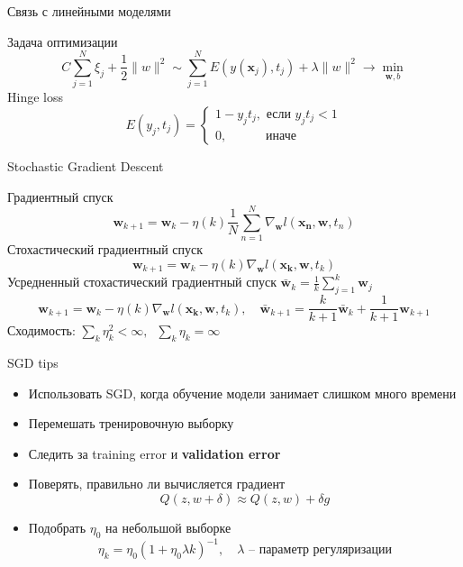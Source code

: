 \documentclass[aspectratio=169]{beamer}
\begin{document}
\begin{frame}{Связь с линейными моделями}

Задача оптимизации 
\[
C \sum_{j=1}^N \xi_j + \frac{1}{2} \|w\|^2 \sim \sum_{j=1}^N E(y(\mathbf{x}_j), t_j) + \lambda \|w\|^2 \rightarrow \min_{\mathbf{w}, b}
\]
Hinge loss
\[
E(y_j, t_j) = \begin{cases}
1 - y_j t_j, \text{ если } y_j t_j < 1 \\
0, \quad\quad\;\;\,\text{ иначе }
\end{cases}
\]

\end{frame}

\begin{frame}{Stochastic Gradient Descent}

Градиентный спуск
\[
\mathbf{w}_{k+1} = \mathbf{w}_k - \eta(k) \frac 1 N \sum_{n=1}^N \nabla_\mathbf{w} l(\mathbf{x_n, \mathbf{w}}, t_n)
\]
Стохастический градиентный спуск
\[
\mathbf{w}_{k+1} = \mathbf{w}_k - \eta(k) \nabla_\mathbf{w} l(\mathbf{x_k, \mathbf{w}}, t_k)
\]
Усредненный стохастический градиентный спуск $\bar{\mathbf{w}}_k = \frac 1 k \sum_{j=1}^k \mathbf{w}_j$
\[
\mathbf{w}_{k+1} = \mathbf{w}_k - \eta(k) \nabla_\mathbf{w} l(\mathbf{x_k, \mathbf{w}}, t_k), \quad \bar{\mathbf{w}}_{k+1} = \frac{k}{k+1} \bar{\mathbf{w}}_{k} + \frac{1}{k+1} \mathbf{w}_{k+1}
\]
Сходимость: $\sum_k \eta_k^2 < \infty, \;\; \sum_k \eta_k = \infty$

\end{frame}

\begin{frame}{SGD tips}

\begin{itemize}
\item Использовать SGD, когда обучение модели занимает слишком много времени
\item Перемешать тренировочную выборку
\item Следить за training error и {\bf validation error}
\item Поверять, правильно ли вычисляется градиент 
\[
Q(z, w + \delta) \approx Q(z, w) + \delta g
\]
\item Подобрать $\eta_0$ на небольшой выборке 
\[
\eta_k = \eta_0 (1 + \eta_0 \lambda k)^{-1}, \quad \lambda\text{ -- параметр регуляризации}
\] 
\end{itemize}

\end{frame}
\end{document}
